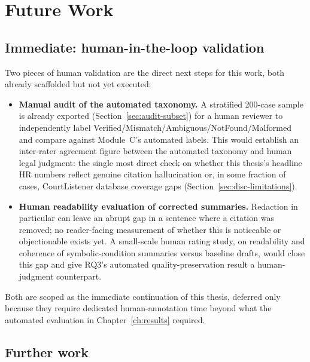 \section{Future Work}
\label{sec:conc-future}

\subsection{Immediate: human-in-the-loop validation}
\label{sec:conc-future-human}

Two pieces of human validation are the direct next steps for this work, both already scaffolded but not yet executed:

\begin{itemize}
  \item \textbf{Manual audit of the automated taxonomy.} A stratified 200-case sample is already exported (Section~\ref{sec:audit-subset}) for a human reviewer to independently label Verified/Mismatch/Ambiguous/NotFound/Malformed and compare against Module~C's automated labels. This would establish an inter-rater agreement figure between the automated taxonomy and human legal judgment: the single most direct check on whether this thesis's headline HR numbers reflect genuine citation hallucination or, in some fraction of cases, CourtListener database coverage gaps (Section~\ref{sec:disc-limitations}).
  \item \textbf{Human readability evaluation of corrected summaries.} Redaction in particular can leave an abrupt gap in a sentence where a citation was removed; no reader-facing measurement of whether this is noticeable or objectionable exists yet. A small-scale human rating study, on readability and coherence of symbolic-condition summaries versus baseline drafts, would close this gap and give RQ3's automated quality-preservation result a human-judgment counterpart.
\end{itemize}

Both are scoped as the immediate continuation of this thesis, deferred only because they require dedicated human-annotation time beyond what the automated evaluation in Chapter~\ref{ch:results} required.

\subsection{Further work}
\label{sec:conc-future-further}

